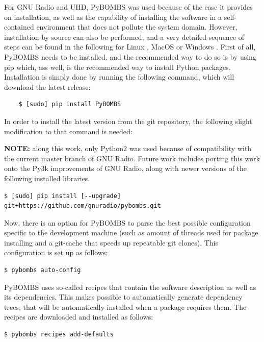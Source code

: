 For GNU Radio and \ac{UHD}, \ac{PyBOMBS} was used because of the ease it provides on installation, as well as the capability of installing the software in a self-contained environment that does not pollute the system domain. However, installation by source can also be performed, and a very detailed sequence of steps can be found in the following for Linux \cite{Linux}, MacOS \cite{OSX} or Windows \cite{Windows}. First of all, \ac{PyBOMBS} needs to be installed, and the recommended way to do so is by using \ac{pip} which, ass well, is the recommended way to install Python packages.  Installation is simply done by running the following command, which will download the latest release:

\begin{lstlisting}
    $ [sudo] pip install PyBOMBS
\end{lstlisting}

In order to install the latest version from the git repository, the following slight modification to that command is needed:

\textbf{NOTE:} along this work, only Python2 was used because of compatibility with the current master branch of GNU Radio. Future work includes porting this work onto the Py3k improvements of GNU Radio, along with newer versions of the following installed libraries.

\begin{lstlisting}[breaklines=true]
    $ [sudo] pip install [--upgrade] git+https://github.com/gnuradio/pybombs.git
\end{lstlisting}

Now, there is an option for \ac{PyBOMBS} to parse the best possible configuration specific to the development machine (such as amount of threads used for package installing and a git-cache that speeds up repeatable git clones). This configuration is set up as follows:

\begin{lstlisting}[breaklines=true]
    $ pybombs auto-config
\end{lstlisting}

\ac{PyBOMBS} uses so-called recipes that contain the software description as well as its dependencies. This makes possible to automatically generate dependency trees, that will be automatically installed when a package requires them. The recipes are downloaded and installed as follows:

\begin{lstlisting}[breaklines=true]
    $ pybombs recipes add-defaults
\end{lstlisting}

